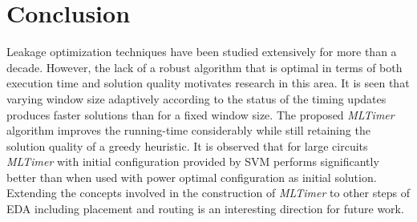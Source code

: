 \section{Conclusion}
\label{sec:conclusion}
Leakage optimization  techniques have been studied extensively for more than a decade.  However, the lack of a robust algorithm that is optimal in terms of both execution time and solution quality motivates research in this area. It is seen that varying window size adaptively according to the status of the timing updates produces faster solutions than for a fixed window size. The proposed \textit{MLTimer} algorithm improves the running-time considerably while still retaining the solution quality of a greedy heuristic. It is observed that for large circuits \textit{MLTimer} with initial configuration provided by SVM performs significantly better than when used with power optimal configuration as initial solution.  Extending the concepts involved in the construction of \textit{MLTimer} to other steps of EDA including placement and routing is an interesting direction for future work.
% 
% 

